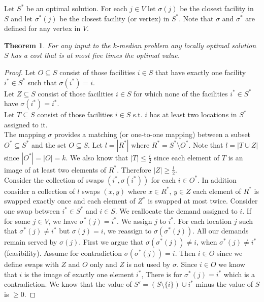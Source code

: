 \documentclass{article}
\newtheorem*{thm}{Theorem}
\theoremstyle{definition}
\begin{document}
Let $S^*$ be an optimal solution.
For each $j\in V$ let $\sigma(j)$ be the closest facility in $S$ and let $\sigma^*(j)$ be the closest facility (or vertex) in $S^*$.
Note that $\sigma$ and $\sigma^*$ are defined for any vertex in $V$.

\begin{thm}
For any input to the $k$-median problem any locally optimal solution $S$ has a cost that is at most five times the optimal value.
\end{thm}


\begin{proof}
Let $O\subseteq S$ consist of those facilities $i\in S$ that have exactly one facility $i^*\in S^*$ such that $\sigma(i^*) = i$. \\
Let $Z \subseteq S$ consist of those facilities $i\in S$ for which none of the facilities $i^* \in S^*$ have $\sigma(i^*) = i^*$. \\
Let $T\subseteq S$ consist of those facilities $i\in S$ s.t. $i$ has at least two locations in $S^*$ assigned to it. \\
The mapping $\sigma$ provides a matching (or one-to-one mapping) between a subset $O^*\subseteq S^*$ and the set $O\subseteq S$.
Let $l= |R^*|$ where $R^* = S^*\setminus O^*$.
Note that $l=|T\cup Z|$ since $|O^*| = |O| = k$.
We also know that $|T|\le \frac{l}{2}$ since each element of $T$ is an image of at least two elements of $R^*$.
Therefore $|Z| \ge \frac{l}{2}$. \\
Consider the collection of swaps $(i^*,\sigma(i^*))$ for each $i\in O^*$.
In addition consider a collection of $l$ swaps $(x,y)$ where $x\in R^*$, $y\in Z$ each element of $R^*$ is swapped exactly once and each element of $Z^*$ is swapped at most twice.
Consider one swap between $i^*\in S^*$ and $i\in S$.
We reallocate the demand assigned to $i$. %
If for some $j\in V$, we have $\sigma^*(j)= i^*$.
We assign $j$ to $i^*$.
For each location $j$ such that $\sigma^*(j) \ne i^*$ but $\sigma(j) = i$, we reassign to $\sigma(\sigma^*(j))$.
All our demands remain served by $\sigma(j)$.
First we argue that $\sigma(\sigma^*(j))\ne i$, when $\sigma^*(j) \ne i^*$ (feasibility).
Assume for contradiction $\sigma(\sigma^*(j)) = i$.
Then $i\in O$ since we define swaps with $Z$ and $O$ only and $Z$ is not used by $\sigma$.
Since $i\in O$ we know that $i$ is the image of exactly one element $i^*$,
There is for $\sigma^*(j) = i^*$ which is a contradiction.
We know that the value of $S' = (S\setminus \{i\})\cup i^*$ minus the value of $S$ is $\ge 0$.

\end{proof}
\end{document}
